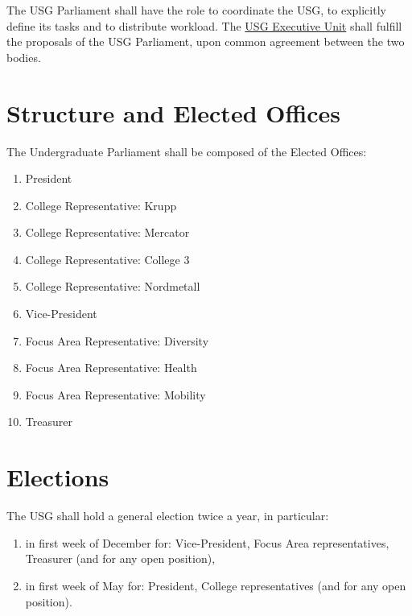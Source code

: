 \label{USGParliamentDef}
The USG Parliament shall have the role to coordinate the USG, to explicitly define its tasks and to distribute workload. The \hyperref[USGexecutiveUnitDef]{USG Executive Unit} shall fulfill the proposals of the USG Parliament, upon common agreement between the two bodies.

\section{Structure and Elected Offices} 
\label{ElectedOfficesDef}
The Undergraduate Parliament shall be composed of the Elected Offices:  
\begin{multicols}{2}
\begin{enumerate}
\item President
\item \label{CRepDef}College Representative: Krupp 
\item College Representative: Mercator 
\item College Representative: College 3
\item College Representative: Nordmetall
\item Vice-President
\item \label{FARepDef} Focus Area Representative: Diversity
\item Focus Area Representative: Health
\item Focus Area Representative: Mobility
\item \label{TreasurerDef} Treasurer
\end{enumerate}
\end{multicols}

\section{Elections}
\label{electiontimes}
The USG shall hold a general election twice a year, in particular:
\begin{enumerate}

\item in first week of December for: Vice-President, Focus Area representatives, Treasurer (and for any open position),
\item in first week of May for: President, College representatives (and for any open position).
\end{enumerate}

